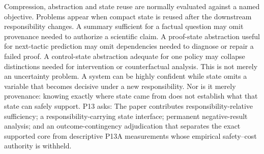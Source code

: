 \markdownRendererDocumentBegin
\markdownRendererSectionBegin
{}\markdownRendererInterblockSeparator
{}Compression, abstraction and state reuse are normally evaluated against a named objective. Problems appear when compact state is reused after the downstream responsibility changes. A summary sufficient for a factual question may omit provenance needed to authorize a scientific claim. A proof-state abstraction useful for next-tactic prediction may omit dependencies needed to diagnose or repair a failed proof. A control-state abstraction adequate for one policy may collapse distinctions needed for intervention or counterfactual analysis.\markdownRendererInterblockSeparator
{}This is not merely an uncertainty problem. A system can be highly confident while state omits a variable that becomes decisive under a new responsibility. Nor is it merely provenance: knowing exactly where state came from does not establish what that state can safely support.\markdownRendererInterblockSeparator
{}P13 asks:\markdownRendererInterblockSeparator
{}\markdownRendererBlockQuoteBegin
{}
\markdownRendererBlockQuoteEnd \markdownRendererInterblockSeparator
{}The paper contributes responsibility-relative sufficiency; a responsibility-carrying state interface; permanent negative-result analysis; and an outcome-contingency adjudication that separates the exact supported core from descriptive P13A measurements whose empirical safety–cost authority is withheld.
\markdownRendererSectionEnd \markdownRendererDocumentEnd